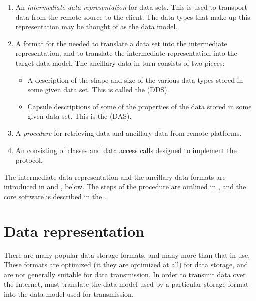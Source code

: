 \begin{enumerate}
  
\item An {\em intermediate data representation} for data sets. This is
  used to transport data from the remote source to the client. The
  data types that make up this representation may be thought of as the
  \opendap data model.
  
\item A format for the {\em{}} needed to translate
  a data set into the intermediate representation, and to translate
  the intermediate representation into the target data model. The
  ancillary data in turn consists of two pieces:

  \begin{itemize}
  
  \item A description of the shape and size of the various data types
    stored in some given data set. This is called the  (DDS).
    
  \item Capsule descriptions of some of the properties of the data
    stored in some given data set.  This is the  (DAS).

  \end{itemize}
  
\item A {\em procedure} for retrieving data and ancillary data from
  remote platforms.
  
\item An {\em{}} consisting of \opendap classes and data access
  calls designed to implement the protocol,

\end{enumerate}

The intermediate data representation and the ancillary data formats
are introduced in  and
, below.  The steps of the procedure are
outlined in , and the \opendap core software
is described in the \OPDapi .

\section{Data representation}
\label{data,types}

There are many popular data storage formats, and many more than that in
use.  These formats are optimized (it they are optimized at all) for data
storage, and are not generally suitable for data transmission.  In order to 
transmit data over the Internet, \opendap must translate the data model used
by a particular storage format into the data model used for transmission.


